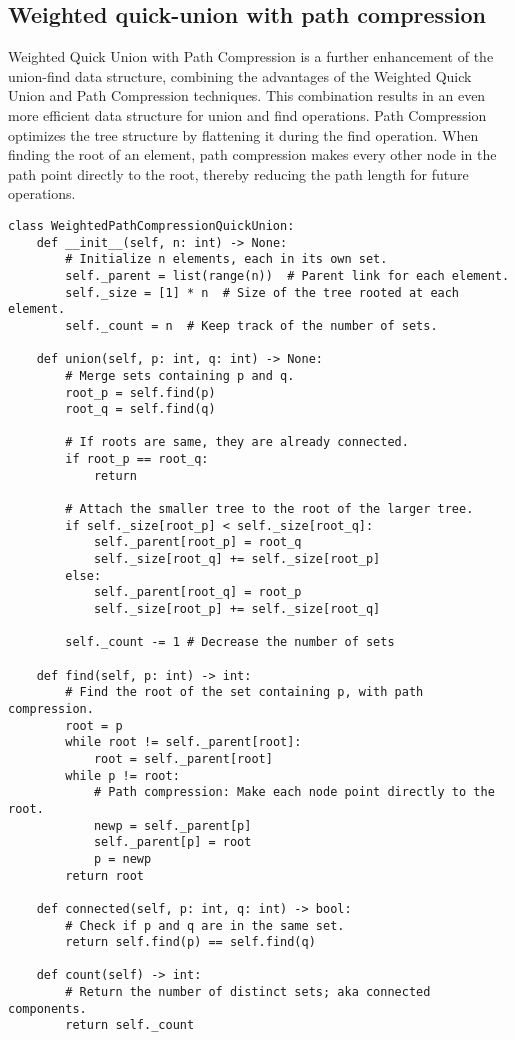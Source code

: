 \documentclass{article}
\begin{document}
\subsection{Weighted quick-union with path compression}

Weighted Quick Union with Path Compression is a further enhancement of the union-find data structure, combining the advantages of the Weighted Quick Union and Path Compression techniques. This combination results in an even more efficient data structure for union and find operations. Path Compression optimizes the tree structure by flattening it during the find operation. When finding the root of an element, path compression makes every other node in the path point directly to the root, thereby reducing the path length for future operations.

\begin{verbatim}
class WeightedPathCompressionQuickUnion:
    def __init__(self, n: int) -> None:
        # Initialize n elements, each in its own set.
        self._parent = list(range(n))  # Parent link for each element.
        self._size = [1] * n  # Size of the tree rooted at each element.
        self._count = n  # Keep track of the number of sets.

    def union(self, p: int, q: int) -> None:
        # Merge sets containing p and q.
        root_p = self.find(p)
        root_q = self.find(q)

        # If roots are same, they are already connected.
        if root_p == root_q:
            return

        # Attach the smaller tree to the root of the larger tree.
        if self._size[root_p] < self._size[root_q]:
            self._parent[root_p] = root_q
            self._size[root_q] += self._size[root_p]
        else:
            self._parent[root_q] = root_p
            self._size[root_p] += self._size[root_q]
            
        self._count -= 1 # Decrease the number of sets
        
    def find(self, p: int) -> int:
        # Find the root of the set containing p, with path compression.
        root = p
        while root != self._parent[root]:
            root = self._parent[root]
        while p != root:
            # Path compression: Make each node point directly to the root.
            newp = self._parent[p]
            self._parent[p] = root
            p = newp
        return root

    def connected(self, p: int, q: int) -> bool:
        # Check if p and q are in the same set.
        return self.find(p) == self.find(q)
    
    def count(self) -> int:
        # Return the number of distinct sets; aka connected components.
        return self._count
\end{verbatim}
\end{document}
